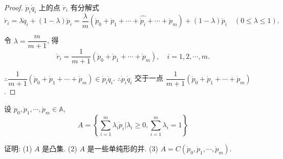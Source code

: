 \documentclass{ctexart}
\begin{document}
\begin{proof}
    $\dot{p}_i\dot{q}_i$ 上的点 $\dot{r}_i$ 有分解式
    \[\dot{r}_i=\lambda\dot{q}_i+(1-\lambda)\dot{p}_i=\dfrac{\lambda}{m}(\dot{p}_0+\dot{p}_1+\cdots+\widehat{\dot{p}_i}+\cdots+\dot{p}_m)+(1-\lambda)\dot{p}_i\quad(0\leq\lambda\leq1).\]

    令 $\lambda=\dfrac{m}{m+1}$, 得
    \[\dot{r}_i=\dfrac{1}{m+1}(\dot{p}_0+\dot{p}_1+\cdots+\dot{p}_m),\quad i=1,2,\cdots,m.\]

    $\therefore\dfrac{1}{m+1}(\dot{p}_0+\dot{p}_1+\cdots+\dot{p}_m)\in\dot{p}_i\dot{q}_i$. $\therefore\dot{p}_i\dot{q}_i$ 交于一点 $\dfrac{1}{m+1}(\dot{p}_0+\dot{p}_1+\cdots+\dot{p}_m)$.
\end{proof}
\begin{exercise}[补充题 2]
    设 $\dot{p}_0,\dot{p}_1,\cdots,\dot{p}_m\in\mathbb{A}$,
    \[A=\left\{\sum\limits_{i=1}^m\lambda_i\dot{p}_i\Bigg|\lambda_i\geq0,\sum\limits_{i=1}^m\lambda_i=1\right\}\]
    
    证明: (1) $A$ 是凸集. (2) $A$ 是一些单纯形的并. (3) $A=C(\dot{p}_0,\dot{p}_1,\cdots,\dot{p}_m)$.
\end{exercise}
\end{document}
